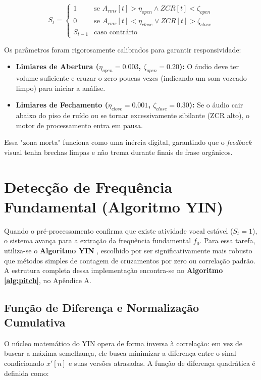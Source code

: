 \documentclass[11pt, a4paper]{article}
\theoremstyle{plain}
\theoremstyle{definition}
\begin{document}
\begin{equation}
    S_t = \begin{cases} 
    1 & \text{se } A_{rms}[t] > \eta_{open} \land ZCR[t] < \zeta_{open} \\
    0 & \text{se } A_{rms}[t] < \eta_{close} \lor ZCR[t] > \zeta_{close} \\
    S_{t-1} & \text{caso contrário}
    \end{cases}
\end{equation}

Os parâmetros foram rigorosamente calibrados para garantir responsividade:
\begin{itemize}
    \item \textbf{Limiares de Abertura ($\eta_{open} = 0.003$, $\zeta_{open} = 0.20$):} O áudio deve ter volume suficiente e cruzar o zero poucas vezes (indicando um som vozeado limpo) para iniciar a análise.
    \item \textbf{Limiares de Fechamento ($\eta_{close} = 0.001$, $\zeta_{close} = 0.30$):} Se o áudio cair abaixo do piso de ruído ou se tornar excessivamente sibilante (ZCR alto), o motor de processamento entra em pausa.
\end{itemize}

Essa "zona morta" funciona como uma inércia digital, garantindo que o \textit{feedback} visual tenha brechas limpas e não trema durante finais de frase orgânicos.

\section{Detecção de Frequência Fundamental (Algoritmo YIN)}

Quando o pré-processamento confirma que existe atividade vocal estável ($S_t = 1$), o sistema avança para a extração da frequência fundamental $f_0$. Para essa tarefa, utiliza-se o \textbf{Algoritmo YIN} \cite{yin2002}, escolhido por ser significativamente mais robusto que métodos simples de contagem de cruzamentos por zero ou correlação padrão. A estrutura completa dessa implementação encontra-se no \textbf{Algoritmo \ref{alg:pitch}}, no Apêndice A.

\subsection{Função de Diferença e Normalização Cumulativa}
O núcleo matemático do YIN opera de forma inversa à correlação: em vez de buscar a máxima semelhança, ele busca minimizar a diferença entre o sinal condicionado $x'[n]$ e suas versões atrasadas. A função de diferença quadrática é definida como:
\end{document}
